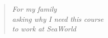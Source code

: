 %
\vspace*{7cm} %
%
\begin{quote}
    \begin{center}
        \textit{For my family\\asking why I need this course\\to work at SeaWorld}
    \end{center}
\end{quote}
%